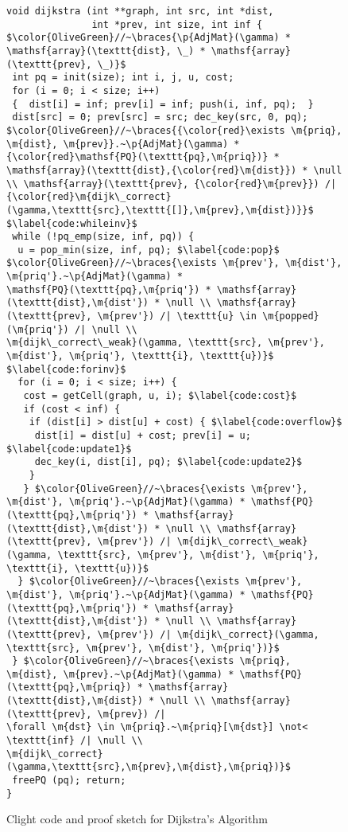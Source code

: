 
\begin{figure}[t]

\begin{lstlisting}[mathescape=true,showlines=true]
void dijkstra (int **graph, int src, int *dist, 
               int *prev, int size, int inf {
$\color{OliveGreen}//~\braces{\p{AdjMat}(\gamma) *
\mathsf{array}(\texttt{dist}, \_) * \mathsf{array}(\texttt{prev}, \_)}$
 int pq = init(size); int i, j, u, cost;
 for (i = 0; i < size; i++)
 {  dist[i] = inf; prev[i] = inf; push(i, inf, pq);  }
 dist[src] = 0; prev[src] = src; dec_key(src, 0, pq);
$\color{OliveGreen}//~\braces{{\color{red}\exists \m{priq}, \m{dist}, \m{prev}}.~\p{AdjMat}(\gamma) * {\color{red}\mathsf{PQ}(\texttt{pq},\m{priq})} * \mathsf{array}(\texttt{dist},{\color{red}\m{dist}}) * \null \\ \mathsf{array}(\texttt{prev}, {\color{red}\m{prev}}) /|
{\color{red}\m{dijk\_correct}(\gamma,\texttt{src},\texttt{[]},\m{prev},\m{dist})}}$ $\label{code:whileinv}$
 while (!pq_emp(size, inf, pq)) {
  u = pop_min(size, inf, pq); $\label{code:pop}$
$\color{OliveGreen}//~\braces{\exists \m{prev'}, \m{dist'}, \m{priq'}.~\p{AdjMat}(\gamma) *
\mathsf{PQ}(\texttt{pq},\m{priq'}) * \mathsf{array}(\texttt{dist},\m{dist'}) * \null \\ \mathsf{array}(\texttt{prev}, \m{prev'}) /| \texttt{u} \in \m{popped}(\m{priq'}) /| \null \\
\m{dijk\_correct\_weak}(\gamma, \texttt{src}, \m{prev'}, \m{dist'}, \m{priq'}, \texttt{i}, \texttt{u})}$ $\label{code:forinv}$
  for (i = 0; i < size; i++) {
   cost = getCell(graph, u, i); $\label{code:cost}$
   if (cost < inf) {
    if (dist[i] > dist[u] + cost) { $\label{code:overflow}$
     dist[i] = dist[u] + cost; prev[i] = u; $\label{code:update1}$ 
     dec_key(i, dist[i], pq); $\label{code:update2}$
    }
   } $\color{OliveGreen}//~\braces{\exists \m{prev'}, \m{dist'}, \m{priq'}.~\p{AdjMat}(\gamma) * \mathsf{PQ}(\texttt{pq},\m{priq'}) * \mathsf{array}(\texttt{dist},\m{dist'}) * \null \\ \mathsf{array}(\texttt{prev}, \m{prev'}) /| \m{dijk\_correct\_weak}(\gamma, \texttt{src}, \m{prev'}, \m{dist'}, \m{priq'}, \texttt{i}, \texttt{u})}$
  } $\color{OliveGreen}//~\braces{\exists \m{prev'}, \m{dist'}, \m{priq'}.~\p{AdjMat}(\gamma) * \mathsf{PQ}(\texttt{pq},\m{priq'}) * \mathsf{array}(\texttt{dist},\m{dist'}) * \null \\ \mathsf{array}(\texttt{prev}, \m{prev'}) /| \m{dijk\_correct}(\gamma, \texttt{src}, \m{prev'}, \m{dist'}, \m{priq'})}$
 } $\color{OliveGreen}//~\braces{\exists \m{priq}, \m{dist}, \m{prev}.~\p{AdjMat}(\gamma) * \mathsf{PQ}(\texttt{pq},\m{priq}) * \mathsf{array}(\texttt{dist},\m{dist}) * \null \\ \mathsf{array}(\texttt{prev}, \m{prev}) /|
\forall \m{dst} \in \m{priq}.~\m{priq}[\m{dst}] \not< \texttt{inf} /| \null \\
\m{dijk\_correct}(\gamma,\texttt{src},\m{prev},\m{dist},\m{priq})}$
 freePQ (pq); return; 
}
\end{lstlisting}
\vspace{-1em}
\caption{Clight code and proof sketch for Dijkstra's Algorithm}
\vspace{-1em}
\label{fig:decorated}
\end{figure} 